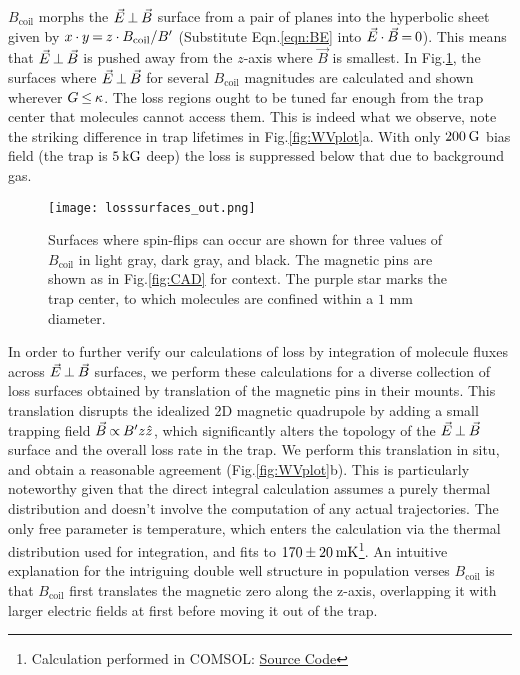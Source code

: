 \documentclass[%
 reprint,
 amsmath,amssymb,
 aps,
prl,
]{revtex4-1}
\newcommand{\bcl}{{$B_\text{coil}$}}
\newcommand{\epb}{{$\vec{E}\s {\perp}\s\vec{B}$}}
\newcommand{\s}{{\nobreak\hspace{.2em}}}
\begin{document}
\bcl{} morphs the \epb{} surface from a pair of planes into the hyperbolic sheet given by
$x\s {\cdot}\s y\s {=}\s  z\s {\cdot}\s B_\text{coil}/B'$
(Substitute Eqn.\s\ref{eqn:BE} into  $\vec{E}\s {\cdot}\s\vec{B}\s {=}\s 0$).
This means that \epb{} is pushed away from the $z$-axis where $\vec{B}$ is smallest.
In Fig.\s\ref{fig:LSurfs}, the surfaces where \epb{} for several \bcl{} magnitudes are calculated and shown wherever $G\s {\le}\s\kappa$.
The loss regions ought to be tuned far enough from the trap center that molecules cannot access them.
This is indeed what we observe, note the striking difference in trap lifetimes in Fig.\s\ref{fig:WVplot}a.
With only $200\s\text{G}$ bias field (the trap is $5\s\text{kG}$ deep) the loss is suppressed below that due to background gas.


\begin{figure}[tb]
\texttt{[image: losssurfaces\_out.png]}%
\caption{
Surfaces where spin-flips can occur are shown for three values of \bcl{} in light gray, dark gray, and black. 
The magnetic pins are shown as in Fig.\s\ref{fig:CAD} for context. 
The purple star marks the trap center, to which molecules are confined within a \raisebox{2.5px}{\texttildelow} $\!\!1\text{ mm}$ diameter.
\label{fig:LSurfs}}
\end{figure}

In order to further verify our calculations of loss by integration of molecule fluxes across \epb{} surfaces, we perform these calculations for a diverse collection of loss surfaces obtained by translation of the magnetic pins in their mounts. 
This translation disrupts the idealized 2D magnetic quadrupole by adding a small trapping field $\vec{B} \s {\propto}\s  B^\prime z\hat{z}$, which significantly alters the topology of the \epb{} surface and the overall loss rate in the trap.
We perform this translation in situ, and obtain a reasonable agreement (Fig.\s\ref{fig:WVplot}b). 
This is particularly noteworthy given that the direct integral calculation assumes a purely thermal distribution and doesn't involve the computation of any actual trajectories.
The only free parameter is temperature, which enters the calculation via the thermal distribution used for integration, and fits to $170\s {\pm}\s 20\s\text{mK}$\s\footnote{Calculation performed in COMSOL: \href{https://github.com/dreens/spin-flip-integration/}{Source Code}}.
An intuitive explanation for the intriguing double well structure in population verses \bcl{} is that \bcl{} first translates the magnetic zero along the z-axis, overlapping it with larger electric fields at first before moving it out of the trap.
\end{document}
